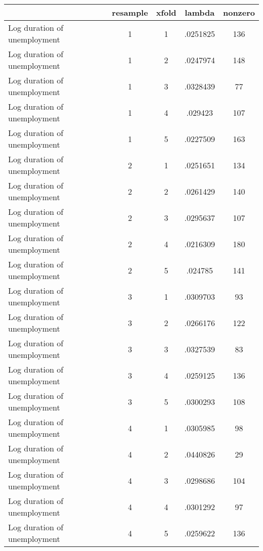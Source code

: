 \begin{tabular}{l*{4}{c}}
\hline\hline
                    &    resample&       xfold&      lambda&     nonzero\\
\hline
Log duration of unemployment&           1&           1&    .0251825&         136\\
Log duration of unemployment&           1&           2&    .0247974&         148\\
Log duration of unemployment&           1&           3&    .0328439&          77\\
Log duration of unemployment&           1&           4&     .029423&         107\\
Log duration of unemployment&           1&           5&    .0227509&         163\\
Log duration of unemployment&           2&           1&    .0251651&         134\\
Log duration of unemployment&           2&           2&    .0261429&         140\\
Log duration of unemployment&           2&           3&    .0295637&         107\\
Log duration of unemployment&           2&           4&    .0216309&         180\\
Log duration of unemployment&           2&           5&     .024785&         141\\
Log duration of unemployment&           3&           1&    .0309703&          93\\
Log duration of unemployment&           3&           2&    .0266176&         122\\
Log duration of unemployment&           3&           3&    .0327539&          83\\
Log duration of unemployment&           3&           4&    .0259125&         136\\
Log duration of unemployment&           3&           5&    .0300293&         108\\
Log duration of unemployment&           4&           1&    .0305985&          98\\
Log duration of unemployment&           4&           2&    .0440826&          29\\
Log duration of unemployment&           4&           3&    .0298686&         104\\
Log duration of unemployment&           4&           4&    .0301292&          97\\
Log duration of unemployment&           4&           5&    .0259622&         136\\

\end{tabular}
